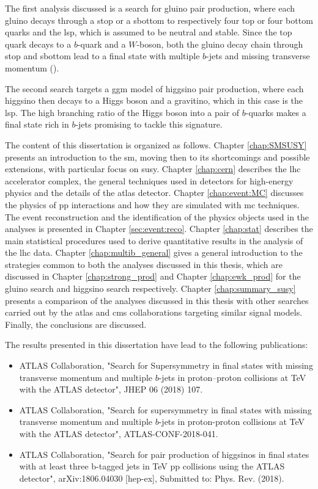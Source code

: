 The first analysis discussed is a search for gluino pair production, where each gluino decays through a stop or a sbottom 
to respectively four top or four bottom quarks and the \gls{lsp}, which is assumed to be neutral and stable.
Since the top quark decays to a $b$-quark and a $W$-boson, both the gluino decay chain through stop and sbottom lead to a 
final state with multiple $b$-jets and missing transverse momentum (\met). 

The second search targets a \gls{ggm} model of higgsino pair production, where each higgsino then decays to a Higgs boson and 
a gravitino, which in this case is the \gls{lsp}. The high branching ratio of the Higgs boson into a pair of $b$-quarks makes a final state 
rich in $b$-jets promising to tackle this signature.

The content of this dissertation is organized as follows. Chapter \ref{chap:SMSUSY} presents an introduction to the \gls{sm}, 
moving then to its shortcomings and possible extensions, with particular focus on \gls{susy}. 
Chapter \ref{chap:cern} describes the \gls{lhc} accelerator complex, the general techniques used in detectors 
for high-energy physics and the details of the \gls{atlas} detector. 
Chapter \ref{chap:event:MC} discusses the physics of \gls{pp} interactions and how they are simulated with \gls{mc} techniques. 
The event reconstruction and the identification of the physics objects used in the analyses is presented in Chapter \ref{sec:event:reco}. 
Chapter \ref{chap:stat} describes the main statistical procedures used to derive quantitative results in the analysis of the \gls{lhc} data.
Chapter \ref{chap:multib_general} gives a general introduction to the strategies common to both the analyses discussed in this thesis, 
which are discussed in Chapter \ref{chap:strong_prod} and Chapter \ref{chap:ewk_prod} for the gluino search and 
higgsino search respectively. 
Chapter \ref{chap:summary_susy} presents a comparison of the analyses discussed in this thesis with other searches carried out 
by the \gls{atlas} and \gls{cms} collaborations targeting similar signal models. 
Finally, the conclusions are discussed. 

The results presented in this dissertation have lead to the following publications:

\begin{itemize}
\item  ATLAS Collaboration, "Search for Supersymmetry in final states with missing transverse momentum and multiple $b$-jets in proton–proton collisions at \cmtre TeV with the ATLAS detector", JHEP 06 (2018) 107. 
\item  ATLAS Collaboration, "Search for supersymmetry in final states with missing transverse momentum and multiple $b$-jets in proton-proton collisions at \cmtre TeV with the ATLAS detector", ATLAS-CONF-2018-041.
\item  ATLAS Collaboration, "Search for pair production of higgsinos in final states with at least three b-tagged jets in \cmtre TeV pp collisions using the ATLAS detector",  
arXiv:1806.04030 [hep-ex], 
Submitted to: Phys. Rev. (2018).
\end{itemize}


